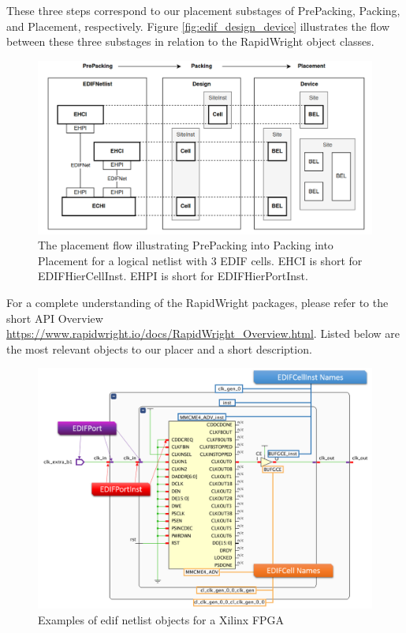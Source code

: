 \documentclass[twocolumn]{article}
\begin{document}
    These three steps correspond to our placement substages of PrePacking, Packing, and Placement, respectively.
    Figure \ref{fig:edif_design_device} illustrates the flow between these three substages in relation to the RapidWright object classes.

    \begin{figure}
        \centering
        \includegraphics[width=\textwidth]{figures/edif_design_device.png}
        \caption{The placement flow illustrating PrePacking into Packing into Placement for a logical netlist with 3 EDIF cells. EHCI is short for EDIFHierCellInst. EHPI is short for EDIFHierPortInst.}
        \label{edif_design_device}
    \end{figure}

    For a complete understanding of the RapidWright packages, please refer to the short API Overview \url{https://www.rapidwright.io/docs/RapidWright_Overview.html}.
    Listed below are the most relevant objects to our placer and a short description.

    \begin{figure}
        \centering
        \includegraphics[width=\textwidth]{figures/edif_netlist.png}
        \caption{Examples of edif netlist objects for a Xilinx FPGA}
        \label{fig:routing_objects}
    \end{figure}
\end{document}
